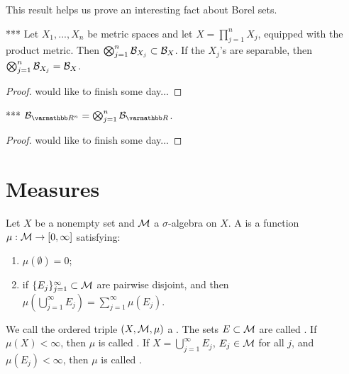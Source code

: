     This result helps us prove an interesting fact about Borel sets.

    \begin{corollary}***
        Let $X_1,...,X_n$ be metric spaces and let $X = \prod_{j = 1}^n X_j$, equipped with the product metric. Then $\bigotimes_{j = 1}^n \mathcal{B}_{X_j} \subset \mathcal{B}_X$. If the $X_j$'s are separable, then $\bigotimes_{j = 1}^n \mathcal{B}_{X_j} = \mathcal{B}_X$.
    \end{corollary}
        \begin{proof}
            {\color{red} would like to finish some day...}
        \end{proof}

    \begin{corollary}***
        $\cB_{\bfR^n} = \bigotimes_{j = 1}^n \cB_{\bfR}$.
    \end{corollary}
        \begin{proof}
            {\color{red} would like to finish some day...}
        \end{proof}
    
\section{Measures}
    \begin{definition}
        Let $X$ be a nonempty set and $\mathcal{M}$ a $\sigma$-algebra on $X$. A  is a function $\mu:\mathcal{M} \rightarrow [0,\infty]$ satisfying:
            \begin{enumerate}[label = (\arabic*),itemsep=1pt,topsep=3pt]
                \item $\mu(\emptyset) = 0$;
                \item if $\{E_j\}_{j = 1}^\infty \subset \mathcal{M}$ are pairwise disjoint, and then $\mu \left( \bigcup_{j = 1}^\infty E_j \right) = \sum_{j = 1}^\infty \mu(E_j)$.
            \end{enumerate}
        We call the ordered triple $(X,\mathcal{M},\mu)$ a . The sets $E \subset \mathcal{M}$ are called . If $\mu(X) < \infty$, then $\mu$ is called . If $X = \bigcup_{j = 1}^\infty E_j$, $E_j \in \mathcal{M}$ for all $j$, and $\mu(E_j) < \infty$, then $\mu$ is called .
    \end{definition}

